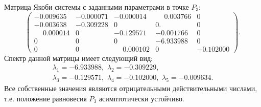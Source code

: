 \documentclass[14pt,a4paper]{extarticle}
\begin{document}
\begin{example}
		Матрица Якоби системы с заданными параметрами в точке $P_3$: 
		\[\begin{pmatrix}
			-0.009635&-0.000071&-0.000014& \phantom{-}0.003766&0\\
			-0.003638&-0.309228& 0       & 0.      & 0\\
  \phantom{-}0.000014& 0   &    -0.129571&-0.001766& 0\\
			 0       & 0     &   0     &  -6.933988& 0\\
			 0       & 0&\phantom{-}0.000102& 0   &   -0.102000 
		\end{pmatrix}.\]
		Спектр данной матрицы имеет следующий вид:
		\begin{multline*}
		\lambda_1=-6.933988,\,\, \lambda_2=-0.309229,\\
		 \lambda_3=-0.129571,\,\, \lambda_4=-0.102000,\,\, \lambda_5=-0.009634.
		\end{multline*}
		Все собственные значения являются отрицательными действительными числами, т.е. положение равновесия $P_3$ асимптотически устойчиво.
		

\end{example}
\end{document}

